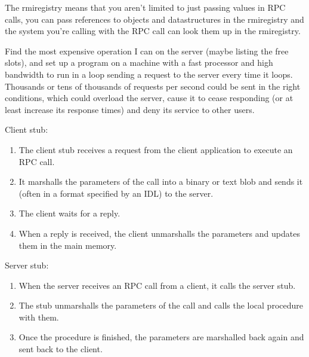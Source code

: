 The rmiregistry means that you aren't limited to just passing values in RPC
calls, you can pass references to objects and datastructures in the rmiregistry
and the system you're calling with the RPC call can look them up in the
rmiregistry.


Find the most expensive operation I can on the server (maybe listing the free
slots), and set up a program on a machine with a fast processor and high
bandwidth to run in a loop sending a request to the server every time it loops.
Thousands or tens of thousands of requests per second could be sent in the right
conditions, which could overload the server, cause it to cease responding (or at
least increase its response times) and deny its service to other users.


Client stub:

\begin{enumerate}
  \item The client stub receives a request from the client application to
    execute an RPC call.
  \item It marshalls the parameters of the call into a binary or text blob and
    sends it (often in a format specified by an IDL) to the server.
  \item The client waits for a reply.
  \item When a reply is received, the client unmarshalls the parameters and
    updates them in the main memory.
\end{enumerate}

Server stub:

\begin{enumerate}
  \item When the server receives an RPC call from a client, it calls the server
    stub.
  \item The stub unmarshalls the parameters of the call and calls the local
    procedure with them.
  \item Once the procedure is finished, the parameters are marshalled back again
    and sent back to the client.
\end{enumerate}


